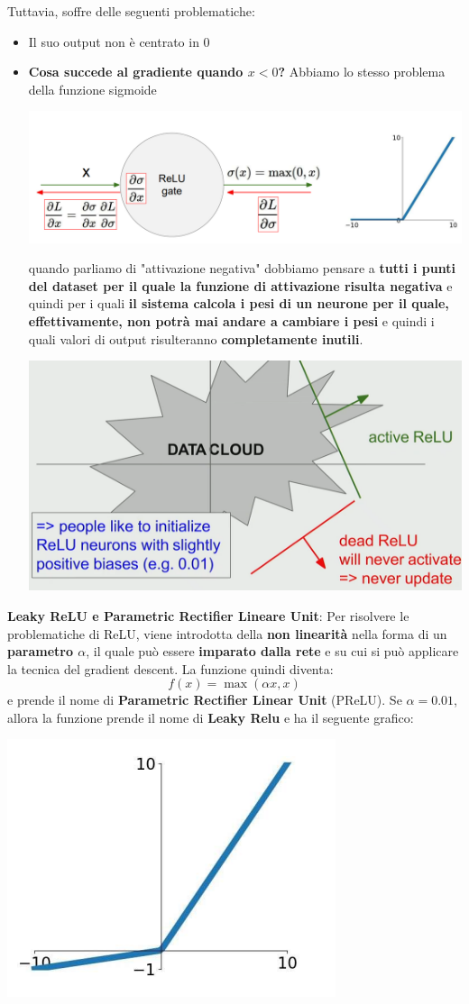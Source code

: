 \documentclass[12pt]{article}
\begin{document}
Tuttavia, soffre delle seguenti problematiche:
\begin{itemize}
    \item Il suo output non è centrato in 0
    \item \textbf{Cosa succede al gradiente quando $x < 0$?} Abbiamo lo stesso problema della funzione sigmoide
    \begin{center}
        \includegraphics[width =0.80\linewidth]{Images/135.PNG}
    \end{center}
    quando parliamo di "attivazione negativa" dobbiamo pensare a \textbf{tutti i punti del dataset per il quale la funzione di attivazione risulta negativa} e quindi per i quali \textbf{il sistema calcola i pesi di un neurone per il quale, effettivamente, non potrà mai andare a cambiare i pesi} e quindi i quali valori di output risulteranno \textbf{completamente inutili}.
    \begin{center}
        \includegraphics[width =0.70\linewidth]{Images/136.PNG}
    \end{center}
\end{itemize}
\textbf{Leaky ReLU e Parametric Rectifier Lineare Unit}: \newline
Per risolvere le problematiche di ReLU, viene introdotta della \textbf{non linearità} nella forma di un \textbf{parametro $\alpha$}, il quale può essere \textbf{imparato dalla rete} e su cui si può applicare la tecnica del gradient descent. La funzione quindi diventa:
$$f(x) = \max(\alpha x, x)$$
e prende il nome di \textbf{Parametric Rectifier Linear Unit} (PReLU). Se $\alpha = 0.01$, allora la funzione prende il nome di \textbf{Leaky Relu} e ha il seguente grafico:
\begin{center}
    \includegraphics[width =0.50\linewidth]{Images/137.PNG}
\end{center}
\end{document}
